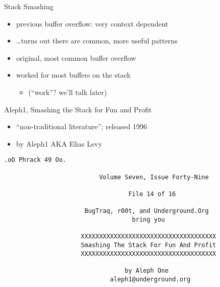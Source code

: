 
\begin{frame}{Stack Smashing}
    \begin{itemize}
    \item previous buffer overflow: very context dependent
    \item \ldots turns out there are common, more useful patterns
    \vspace{.5cm}
    \item original, most common buffer overflow 
    \item worked for most buffers on the stack
        \begin{itemize}
        \item (``work''? we'll talk later)
        \end{itemize}
    \end{itemize}
\end{frame}

\begin{frame}[fragile,label=smashing]{Aleph1, Smashing the Stack for Fun and Profit}
    \begin{itemize}
    \item ``non-traditional literature''; released 1996
    \item by Aleph1 AKA Elias Levy
    \end{itemize}
\begin{Verbatim}[fontsize=\scriptsize]
                               .oO Phrack 49 Oo.

                          Volume Seven, Issue Forty-Nine
                                     
                                  File 14 of 16

                      BugTraq, r00t, and Underground.Org
                                   bring you

                     XXXXXXXXXXXXXXXXXXXXXXXXXXXXXXXXXXXXX
                     Smashing The Stack For Fun And Profit
                     XXXXXXXXXXXXXXXXXXXXXXXXXXXXXXXXXXXXX

                                 by Aleph One
                             aleph1@underground.org
\end{Verbatim}
\end{frame}
